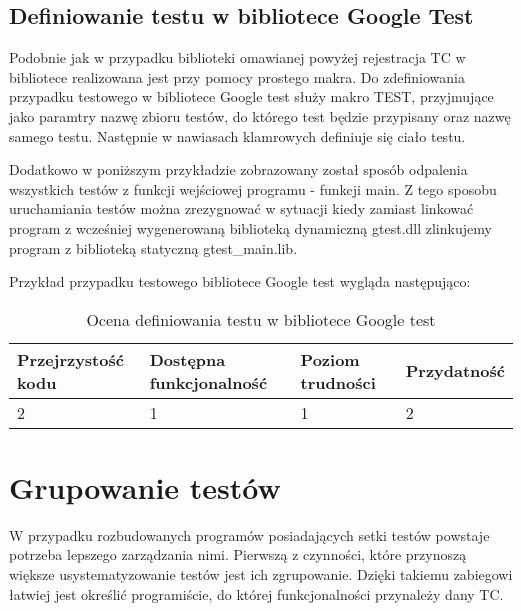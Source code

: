 \documentclass[12pt,a4paper,notitlepage]{report}
\begin{document}
\section{Definiowanie testu w bibliotece Google Test}

Podobnie jak w przypadku biblioteki omawianej powyżej rejestracja TC w bibliotece realizowana jest przy pomocy prostego makra. 
Do zdefiniowania przypadku testowego w bibliotece Google test służy makro TEST, przyjmujące jako paramtry nazwę zbioru testów, do którego test będzie przypisany oraz nazwę samego testu. Następnie w nawiasach klamrowych definiuje się ciało testu.

Dodatkowo w poniższym przykładzie zobrazowany został sposób odpalenia wszystkich testów z funkcji wejściowej programu - funkcji main. Z tego sposobu uruchamiania testów można zrezygnować w sytuacji kiedy zamiast linkować program z wcześniej wygenerowaną biblioteką dynamiczną gtest.dll zlinkujemy program z biblioteką statyczną gtest{\_}main.lib.

Przykład przypadku testowego bibliotece Google test wygląda następująco:

			

\begin{center}
			\begin{table}[!ht]
			\caption{Ocena definiowania testu w bibliotece Google test}
			\label{}
			\begin{tabular}[!hc]{|l|l|l|l|}
		\hline
		Przejrzystość kodu 	&	Dostępna funkcjonalność	&	Poziom trudności	&	Przydatność \\ \hline
		2					&	1						&	1					& 	2  			\\ \hline
			\end{tabular}
			\end{table} 
		\end{center}

\chapter{Grupowanie testów}

W przypadku rozbudowanych programów posiadających setki testów powstaje potrzeba lepszego zarządzania nimi. Pierwszą z czynności, które przynoszą większe usystematyzowanie testów jest ich zgrupowanie. Dzięki takiemu zabiegowi łatwiej jest określić programiście, do której funkcjonalności przynależy dany TC.
\end{document}
